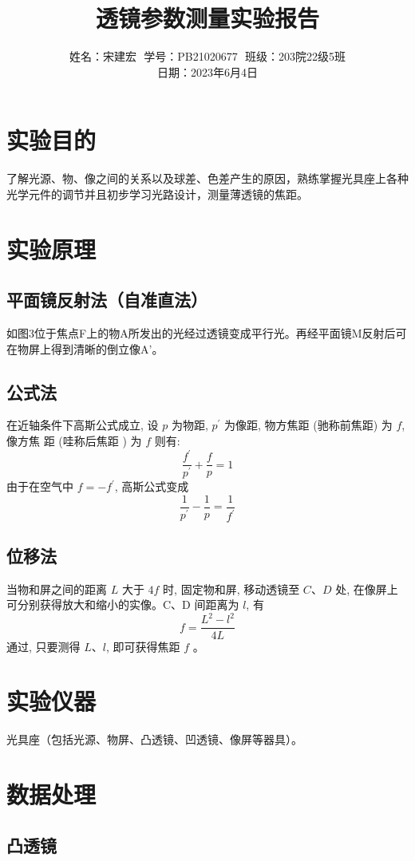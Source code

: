 \documentclass{article}
\title{透镜参数测量实验报告}
\author{姓名：宋建宏\,\, 学号：PB21020677\,\, 班级：203院22级5班\\ 日期：2023年6月4日}
\date{}
\begin{document}
\maketitle

\section*{实验目的}
了解光源、物、像之间的关系以及球差、色差产生的原因，熟练掌握光具座上各种光学元件的调节并且初步学习光路设计，测量薄透镜的焦距。
\section*{实验原理}

\subsection*{平面镜反射法（自准直法）}
如图3位于焦点F上的物A所发出的光经过透镜变成平行光。再经平面镜M反射后可在物屏上得到清晰的倒立像A'。

\subsection*{公式法}

在近轴条件下高斯公式成立, 设 $p$ 为物距, $p^{\prime}$ 为像距, 物方焦距 (驰称前焦距) 为 $f$, 像方焦 距 (哇称后焦距 ) 为 $f$ 则有:
$$
\frac{f^{\prime}}{p^{\prime}}+\frac{f}{p}=1
$$
由于在空气中 $f=-f^{\prime}$, 高斯公式变成
$$
\frac{1}{p^{\prime}}-\frac{1}{p}=\frac{1}{f^{\prime}}
$$
\subsection*{位移法}
当物和屏之间的距离 $L$ 大于 $4 f$ 时, 固定物和屏, 移动透镜至 $C 、 D$ 处, 在像屏上可分别获得放大和缩小的实像。C、D 间距离为 $l$, 有
$$
f=\frac{L^2-l^2}{4 L}
$$
通过, 只要测得 $L $、$ l$, 即可获得焦距 $f$ 。


\section*{实验仪器}
光具座（包括光源、物屏、凸透镜、凹透镜、像屏等器具）。

\section*{数据处理}

\subsection*{凸透镜}
\end{document}
